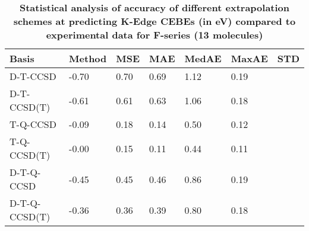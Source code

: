 \begin{table}
  \caption{\textbf{Statistical analysis of accuracy of different extrapolation schemes at predicting K-Edge CEBEs (in eV) compared to experimental data for F-series (13 molecules)}}
  \begin{tabular}{l l l l l l l }
    \toprule
    \textbf{Basis} & \textbf{Method} & \textbf{MSE} & \textbf{MAE} & \textbf{MedAE} & \textbf{MaxAE} & \textbf{STD} \\ 
    \midrule
    D-T-CCSD & -0.70 & 0.70 & 0.69 & 1.12 & 0.19 \\ 
    D-T-CCSD(T) & -0.61 & 0.61 & 0.63 & 1.06 & 0.18 \\ 
    T-Q-CCSD & -0.09 & 0.18 & 0.14 & 0.50 & 0.12 \\ 
    T-Q-CCSD(T) & -0.00 & 0.15 & 0.11 & 0.44 & 0.11 \\ 
    D-T-Q-CCSD & -0.45 & 0.45 & 0.46 & 0.86 & 0.19 \\ 
    D-T-Q-CCSD(T) & -0.36 & 0.36 & 0.39 & 0.80 & 0.18 \\ 
    \bottomrule
  \end{tabular}
\end{table}
